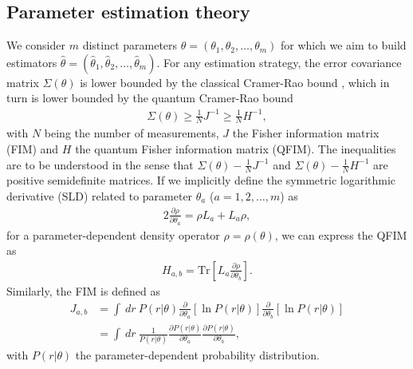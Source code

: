 \documentclass[reprint,amsmath,amssymb,aps,pra,floatfix]{revtex4-2}
\begin{document}
\subsection{Parameter estimation theory}
We consider $m$ distinct parameters $\theta = (\theta_1,\theta_2,\dots,\theta_m)$ for which we aim to build estimators $ \hat{\theta} = (\hat{\theta}_1,\hat{\theta}_2,\dots,\hat{\theta}_m)$. For any estimation strategy, the error covariance matrix $\Sigma(\theta)$ is lower bounded by the classical Cramer-Rao bound \cite{helstrom1969quantum,braunstein1994statistical}, which in turn is lower bounded by the quantum Cramer-Rao bound \cite{lehmann2006theory,van2004detection}
\begin{align}
    \Sigma(\theta) \geq \frac{1}{N} J^{-1} \geq \frac{1}{N} H^{-1},
\end{align}
with $N$ being the number of measurements, $J$ the Fisher information matrix (FIM) and $H$ the quantum Fisher information matrix (QFIM). The inequalities are to be understood in the sense that $\Sigma(\theta) - \frac{1}{N} J^{-1}$  and $\Sigma(\theta) - \frac{1}{N} H^{-1}$ are positive semidefinite matrices.
If we implicitly define the symmetric logarithmic derivative (SLD) related to parameter $\theta_a$ ($a=1,2,\dots,m$) as
\begin{align}
   2\frac{\partial \rho}{\partial \theta_a} = \rho L_a+ L_a \rho,
\label{def:sld}
\end{align}
for a parameter-dependent density operator $\rho=\rho(\theta)$, we can express the QFIM as
\begin{align}
    H_{a,b} = \text{Tr} \left [ L_{a} \frac{\partial \rho}{\partial \theta_{b}} \right ].
\label{def:QFIM}
\end{align}
Similarly,  the FIM is defined as
\begin{align}
    J_{a,b} &= \int \ dr \ P(r|\theta) \frac{\partial}{\partial \theta_a}\left[ \ln P(r|\theta)\right] \frac{\partial}{\partial \theta_b}\left[ \ln P(r|\theta)\right]\\
            &= \int \ dr \ \frac{1}{P(r|\theta)} \frac{\partial P(r|\theta)}{\partial \theta_a}\frac{\partial P(r|\theta)}{\partial \theta_b},
\label{def:FIM}
\end{align}
with $P(r|\theta)$ the parameter-dependent probability distribution.
\end{document}
